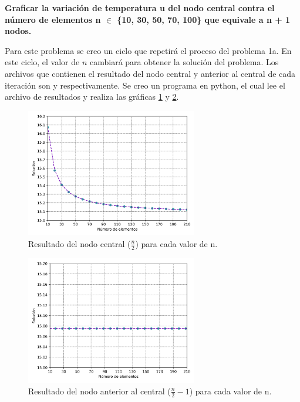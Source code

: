 \textbf{Graficar la variación de temperatura u del nodo central contra el número de elementos n $\in$ \{10, 30, 50, 70, 100\} que equivale a n + 1 nodos.}

Para este problema se creo un ciclo que repetirá el proceso del problema 1a. En este ciclo, el valor de $n$ cambiará para obtener la solución del problema. Los archivos que contienen el resultado del nodo central y  anterior al central de cada iteración son  y  respectivamente. Se creo un programa en python, el cual lee el archivo de resultados y realiza las gráficas \ref{fig:heat_results_1} y \ref{fig:heat_results_2}.

\begin{center}
    \begin{minipage}{0.45\linewidth}
        \begin{figure}[H]
            \centering
            \includegraphics[width=7.5cm]{Graphics/heat_results_1.png}
            \caption{Resultado del nodo central ($\frac{n}{2}$) para cada valor de n.}
            \label{fig:heat_results_1}
        \end{figure}
    \end{minipage}
    \hspace{0.5cm}
    \begin{minipage}{0.45\linewidth}
        \begin{figure}[H]
            \centering
            \includegraphics[width=7.5cm]{Graphics/heat_results_2.png}
            \caption{Resultado del nodo anterior al central ($\frac{n}{2}-1$) para cada valor de n.}
            \label{fig:heat_results_2}
        \end{figure}
    \end{minipage}
\end{center}